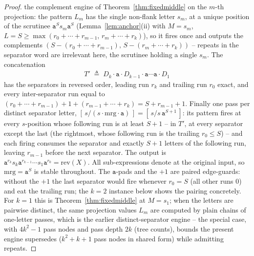 \documentclass[runningheads,envcountsect]{llncs}
\begin{document}
\begin{proof}
    the complement engine of Theorem~\ref{thm:fixedmiddle} on the $m$-th projection: the pattern $L_m$ has the single non-flank letter $s_m$, at a unique position of the scrutinee $\mathtt a^S s_m \mathtt a^S$ (Lemma~\ref{lem:anchor}(ii) with $M = s_m$, $L = S \geq \max(r_0 + \cdots + r_{m-1},\, r_m + \cdots + r_k)$), so it fires once and outputs the complements $(S - (r_0 + \cdots + r_{m-1}),\, S - (r_m + \cdots + r_k))$ -- repeats in the separator word are irrelevant here, the scrutinee holding a single $s_m$. The concatenation
    \begin{align*}
        T' \;\triangleq\; D_k \cdot \mathtt a \cdot D_{k-1} \cdot \mathtt a \cdots \mathtt a \cdot D_1
    \end{align*}
    has the separators in reversed order, leading run $r_k$ and trailing run $r_0$ exact, and every inter-separator run equal to $(r_0 + \cdots + r_{m-1}) + 1 + (r_{m-1} + \cdots + r_k) = S + r_{m-1} + 1$. Finally one pass per distinct separator letter, $[\,s/(s \cdot \mathrm{mrg} \cdot \mathtt a)\,] = [\,s/s\,\mathtt a^{S+1}\,]$: its pattern fires at every $s$-position whose following run is at least $S + 1$ -- in $T'$, at every separator except the last (the rightmost, whose following run is the trailing $r_0 \leq S$) -- and each firing consumes the separator and exactly $S + 1$ letters of the following run, leaving $r_{m-1}$ before the next separator. The output is $\mathtt a^{r_k} s_k \mathtt a^{r_{k-1}} \cdots s_1 \mathtt a^{r_0} = \mathrm{rev}(X)$. All sub-expressions denote at the original input, so $\mathrm{mrg} = \mathtt a^S$ is stable throughout. The $\mathtt a$-pads and the $+1$ are paired edge-guards: without the $+1$ the last separator would fire whenever $r_0 = S$ (all other runs $0$) and eat the trailing run; the $k = 2$ instance below shows the pairing concretely. For $k = 1$ this is Theorem~\ref{thm:fixedmiddle} at $M = s_1$; when the letters are pairwise distinct, the same projection values $L_m$ are computed by plain chains of one-letter passes, which is the earlier distinct-separator engine -- the special case, with $4k^2 - 1$ pass nodes and pass depth $2k$ (tree counts), bounds the present engine supersedes ($k^2 + k + 1$ pass nodes in shared form) while admitting repeats.
\end{proof}
\end{document}
